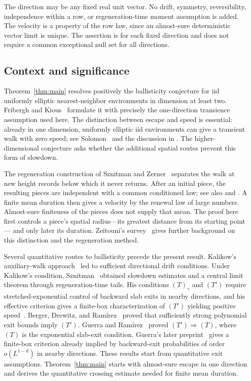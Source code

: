 The direction may be any fixed real unit vector. No drift, symmetry,
reversibility, independence within a row, or regeneration-time moment
assumption is added. The velocity is a property of the row law, since an
almost-sure deterministic vector limit is unique. The assertion is for
each fixed direction and does not require a common exceptional null set
for all directions.

\subsection{Context and significance}

Theorem~\ref{thm:main} resolves positively the ballisticity conjecture for
iid uniformly elliptic nearest-neighbor environments in dimension at
least two. Fribergh and Kious~\cite[Conjecture~1.1]{FriberghKious2016}
formulate it with precisely the one-direction transience assumption used
here. The distinction between escape and speed is essential: already in
one dimension, uniformly elliptic iid environments can give a transient
walk with zero speed; see Solomon~\cite{Solomon1975} and the discussion in
\cite[p.~510]{Sznitman2002}. The higher-dimensional conjecture asks whether
the additional spatial routes prevent this form of slowdown.

The regeneration construction of Sznitman and
Zerner~\cite{SznitmanZerner1999} separates the walk at new height records
below which it never returns. After an initial piece, the resulting
pieces are independent with a common conditioned law; see also
\cite[Section~1]{Sznitman2002} and
\cite[Section~2]{FriberghKious2016}. A finite mean duration then gives a
velocity by the renewal law of large numbers. Almost-sure finiteness of
the pieces does not supply that mean. The proof here first controls a
piece's spatial radius---its greatest distance from its starting point---
and only later its duration. Zeitouni's
survey~\cite{Zeitouni2006} gives further background on this distinction
and the regeneration method.

Several quantitative routes to ballisticity precede the present result.
Kalikow's auxiliary-walk approach~\cite{Kalikow1981} led to sufficient
directional drift conditions. Under Kalikow's condition,
Sznitman~\cite{Sznitman2000} obtained slowdown estimates and a central
limit theorem through regeneration-time tails. His conditions
$(T)_\gamma$ and $(T')$ require stretched-exponential control of backward
slab exits in nearby directions, and his effective criterion gives a
finite-box characterization of $(T')$ yielding positive
speed~\cite{Sznitman2002}. Berger, Drewitz, and
Ram\'irez~\cite{BergerDrewitzRamirez2014} proved that sufficiently strong
polynomial exit bounds imply $(T')$. Guerra and
Ram\'irez~\cite{GuerraRamirez2020} proved $(T')\Rightarrow(T)$, where
$(T)$ is the exponential slab-exit condition. Guerra's later
preprint~\cite[Definition~1.4 and Theorem~1.9]{Guerra2020WeakCriterion}
gives a finite-box criterion already implied by backward-exit
probabilities of order $o(L^{1-d})$ in nearby directions. These results
start from quantitative exit assumptions. Theorem~\ref{thm:main}
starts with almost-sure escape in one direction and derives the
quantitative crossing estimate needed for finite mean duration.

